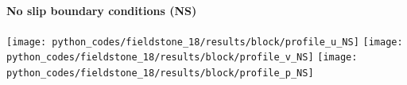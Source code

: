 \paragraph{No slip boundary conditions (NS)}



\begin{center}
\texttt{[image: python\_codes/fieldstone\_18/results/block/profile\_u\_NS]}
\texttt{[image: python\_codes/fieldstone\_18/results/block/profile\_v\_NS]}
\texttt{[image: python\_codes/fieldstone\_18/results/block/profile\_p\_NS]}
\end{center}



